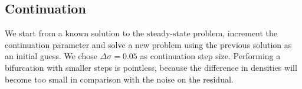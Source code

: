 



\subsection{Continuation}
 We start from a known solution to the steady-state problem, increment the continuation parameter and solve a new problem using the previous solution as an initial guess. We chose $\Delta \sigma = 0.05$ as continuation step size. Performing a bifurcation with smaller steps is pointless, because the difference in densities will become too small in comparison with the noise on the residual.


